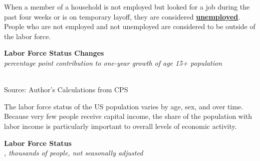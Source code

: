 \documentclass{report}
\makeatletter
\newcommand{\tbllink}[1]{\href{https://raw.githubusercontent.com/bdecon/US-chartbook/master/chartbook/data/#1}{\faTable}}
\newcommand*\short[1]{\expandafter\@gobbletwo\number\numexpr#1\relax}
\newcommand{\tkbar}[4]{
		\addplot[ybar stacked, bar width=2.8pt, draw opacity=0, fill=#1] 
			table [x=#2, y=#3, col sep=comma]{#4};}
\newcommand{\dateaxisticks}{
		date coordinates in=x, axis line style={draw=none},
		xmax={2020-05-10},
		max space between ticks=40,	    
		xtick={{1990-01-01}, {1992-01-01}, {1994-01-01}, 
			{1996-01-01}, {1998-01-01}, {2000-01-01}, 
			{2002-01-01}, {2004-01-01}, {2006-01-01},
			{2008-01-01}, {2010-01-01}, {2012-01-01}, {2014-01-01},
		    {2016-01-01}, {2018-01-01}, {2020-01-01}},
		minor xtick={{1989-01-01}, {1991-01-01}, {1993-01-01},
			{1995-01-01}, {1997-01-01}, {1999-01-01}, 
			{2001-01-01}, {2003-01-01}, {2005-01-01}, {2007-01-01},
		    {2009-01-01}, {2011-01-01}, {2013-01-01}, {2015-01-01},
		    {2017-01-01}, {2019-01-01}},
		enlarge y limits={0.06}, enlarge x limits={0.01},
		}
\newcommand{\bbar}[2]{extra #1 ticks = {{#2}}, extra #1 tick labels = ,
		extra #1 tick style = {grid=major, grid style={thick, black!25}},}
\newcommand{\rbars}{
		\fill[color=black!10] (axis cs:{1990-07-01},\pgfkeysvalueof{/pgfplots/ymin}) rectangle 
			(axis cs:{1991-03-01}, \pgfkeysvalueof{/pgfplots/ymax});
		\fill[color=black!10] (axis cs:{2007-12-01},\pgfkeysvalueof{/pgfplots/ymin}) rectangle 
			(axis cs:{2009-07-01}, \pgfkeysvalueof{/pgfplots/ymax});
		\fill[color=black!10] (axis cs:{2001-03-01},\pgfkeysvalueof{/pgfplots/ymin}) rectangle 
			(axis cs:{2001-11-01}, \pgfkeysvalueof{/pgfplots/ymax});}
\makeatother
\begin{document}
{{{{{{{\begin{minipage}{0.76\textwidth}
\small When a member of a household is not employed but looked for a job during the past four weeks or is on temporary layoff, they are considered \href{https://www.bls.gov/cps/cps_htgm.htm}{\textbf{unemployed}}. \\

People who are not employed and not unemployed are considered to be outside of the labor force.  \\

\vspace{3mm}

\noindent \normalsize \textbf{Labor Force Status Changes}\\
\footnotesize{\textit{percentage point contribution to one-year growth of age 15+ population}}\\
\noindent \hspace*{-2mm} \\
\footnotesize{Source: Author's Calculations from CPS} \hfill \tbllink{cps_lfs2.csv}

\end{minipage}

\newpage

\begin{minipage}{0.76\textwidth}

\small The labor force status of the US population varies by age, sex, and over time. Because very few people receive capital income, the share of the population with labor income is particularly important to overall levels of economic activity. \\

\vspace{1mm}


\noindent \normalsize \textbf{Labor Force Status}\\
\footnotesize{\textit{, thousands of people, not seasonally adjusted}}\\


\end{minipage}}}}}}}}
\end{document}
